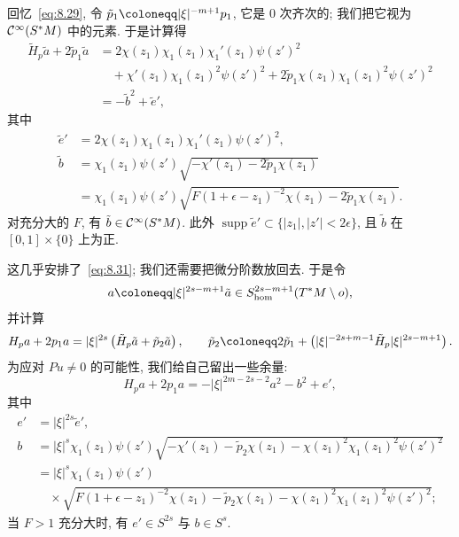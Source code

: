 回忆~\eqref{eq:8.29}, 令 $\tilde{p}_1 \defeq | \xi |^{-m+1}p_1$, 它是 $0$ 次齐次的; 我们把它视为 $\mathcal{C}^\infty(S^*M)$ 中的元素. 于是计算得
\begin{equation}\label{eq:8.46}
    \begin{aligned}
        \tilde{H}_p\tilde{a} + 2\tilde{p}_1\tilde{a}
        &= 2\chi(z_1)\chi_1(z_1)\chi_1'(z_1)\psi(z')^2 \\
        &\quad + \chi'(z_1)\chi_1(z_1)^2\psi(z')^2 + 2\tilde{p}_1\chi(z_1)\chi_1(z_1)^2\psi(z')^2 \\
        &= -\tilde{b}^2 + \tilde{e}',
    \end{aligned}
\end{equation}
其中
\begin{equation}\label{eq:8.47}
    \begin{aligned}
        \tilde{e}' &= 2\chi(z_1)\chi_1(z_1)\chi_1'(z_1)\psi(z')^2, \\
        \tilde{b} &= \chi_1(z_1)\psi(z')\sqrt{-\chi'(z_1) - 2\tilde{p}_1\chi(z_1)} \\
        &= \chi_1(z_1)\psi(z')\sqrt{F(1 + \epsilon - z_1)^{-2}\chi(z_1) - 2\tilde{p}_1\chi(z_1)}.
    \end{aligned}
\end{equation}
对充分大的 $F$, 有 $\tilde{b} \in \mathcal{C}^\infty(S^*M)$. 此外 $\operatorname{supp}\tilde{e}' \subset \{| z_1 |, | z' | < 2\epsilon\}$, 且 $\tilde{b}$ 在 $[0, 1] \times \{0\}$ 上为正.

这几乎安排了~\eqref{eq:8.31}; 我们还需要把微分阶数放回去. 于是令
\begin{equation}\label{eq:8.48}
    a \defeq | \xi |^{2s-m+1}\tilde{a} \in S^{2s-m+1}_{\mathrm{hom}}(T^*M \setminus o),
\end{equation}
并计算
\begin{equation}\label{eq:8.49}
    H_p a + 2 p_1 a = | \xi |^{2s}\left( \tilde{H}_p\tilde{a} + \tilde{p}_2\tilde{a} \right), \qquad \tilde{p}_2 \defeq 2\tilde{p}_1 + \left( | \xi |^{-2s+m-1}\tilde{H}_p| \xi |^{2s-m+1} \right).
\end{equation}
为应对 $Pu \neq 0$ 的可能性, 我们给自己留出一些余量:
\begin{equation}\label{eq:8.50}
    H_p a + 2 p_1 a = -| \xi |^{2m-2s-2}a^2 - b^2 + e',
\end{equation}
其中
\begin{equation}\label{eq:8.51}
    \begin{aligned}
        e' &= | \xi |^{2s}\tilde{e}', \\
        b &= | \xi |^{s}\chi_1(z_1)\psi(z')\sqrt{-\chi'(z_1) - \tilde{p}_2\chi(z_1) - \chi(z_1)^2\chi_1(z_1)^2\psi(z')^2} \\
        &= | \xi |^{s}\chi_1(z_1)\psi(z') \\
        &\quad \times \sqrt{F(1 + \epsilon - z_1)^{-2}\chi(z_1) - \tilde{p}_2\chi(z_1) - \chi(z_1)^2\chi_1(z_1)^2\psi(z')^2};
    \end{aligned}
\end{equation}
当 $F > 1$ 充分大时, 有 $e' \in S^{2s}$ 与 $b \in S^s$.



